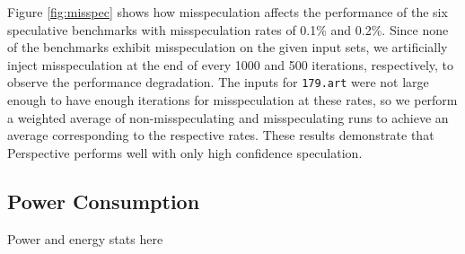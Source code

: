 Figure \ref{fig:misspec} shows how misspeculation affects the
performance of the six speculative benchmarks with misspeculation rates of
0.1\% and 0.2\%. Since none of the benchmarks exhibit misspeculation on the
given input sets, we artificially inject misspeculation at the end of
every 1000 and 500 iterations, respectively, to observe the performance
degradation. The inputs for \texttt{179.art} were not large enough to have
enough iterations for misspeculation at these rates, so we perform a
weighted average of non-misspeculating and misspeculating runs to achieve
an average corresponding to the respective rates. These results demonstrate
that Perspective performs well with only high confidence speculation.

\subsection{Power Consumption}

Power and energy stats here

